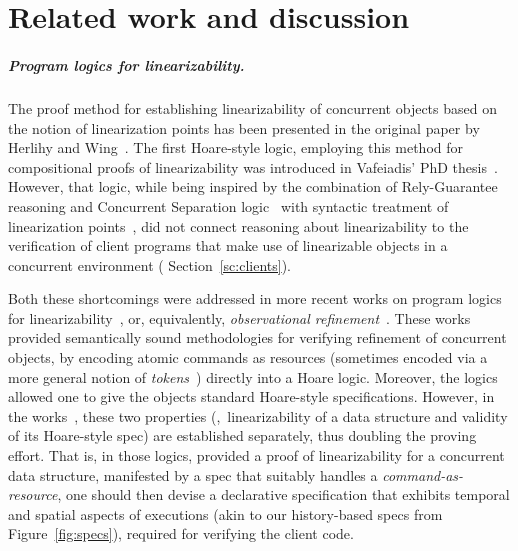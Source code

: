 \section{Related work and discussion}
\label{sc:related}


\subparagraph*{Program logics for linearizability.}

The proof method for establishing linearizability of concurrent
objects based on the notion of linearization points has been presented
in the original paper by Herlihy and
Wing~\cite{HerlihyW+TOPLAS90}. The first Hoare-style logic, employing
this method for compositional proofs of linearizability was introduced
in Vafeiadis' PhD thesis~\cite{VafeiadisHHS+PPoPP06, Vafeiadis+PhD07}.
However, that logic, while being inspired by the combination of
Rely-Guarantee reasoning and Concurrent Separation
logic~\cite{VafeiadisP+CONCUR07} with syntactic treatment of
linearization points~\cite{VafeiadisHHS+PPoPP06}, did not connect
reasoning about linearizability to the verification of client programs
that make use of linearizable objects in a concurrent environment (\cf
Section~\ref{sc:clients}).

%


Both these shortcomings were addressed in more recent works on program
logics for linearizability~\cite{LiangF+PLDI13,Khyzha-al:FM16}, or,
equivalently, \emph{observational
  refinement}~\cite{FilipovicOHRW+TCS10,TuronDB+ICFP13}. These works
provided semantically sound methodologies for verifying refinement of
concurrent objects, by encoding atomic commands as resources
(sometimes encoded via a more general notion of
\emph{tokens}~\cite{Khyzha-al:FM16}) directly into a Hoare
logic. Moreover, the logics~\cite{LiangF+PLDI13, TuronDB+ICFP13}
allowed one to give the objects standard Hoare-style specifications.
%
However, in the works~\cite{LiangF+PLDI13,TuronDB+ICFP13}, these two
properties (\ie,~linearizability of a data structure and validity of
its Hoare-style spec) are established separately, thus doubling the
proving effort.
%
That is, in those logics, provided a proof of linearizability for a
concurrent data structure, manifested by a spec that suitably handles
a \emph{command-as-resource}, one should then devise a declarative
specification that exhibits temporal and spatial aspects of executions
(akin to our history-based specs from Figure~\ref{fig:specs}),
required for verifying the client code.

